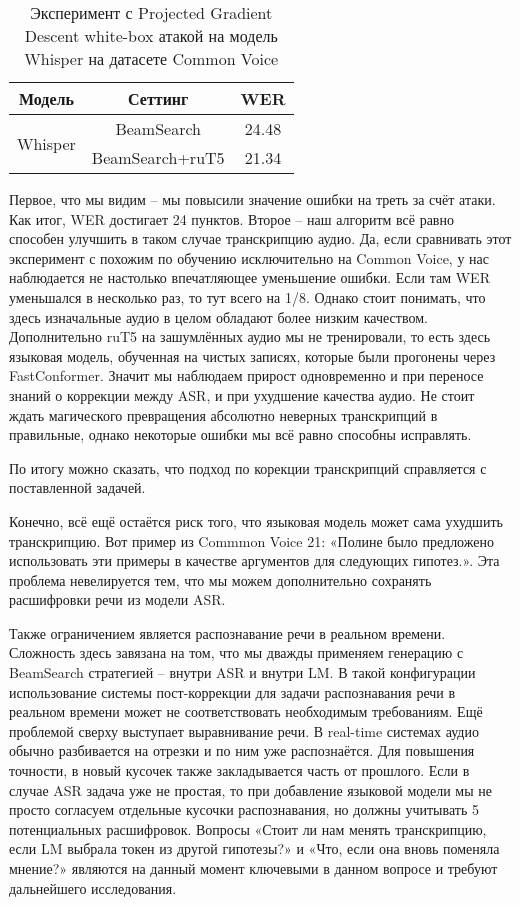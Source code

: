 \begin{table}[]
\centering
\caption{Эксперимент с Projected Gradient Descent white-box атакой на модель Whisper на датасете Common Voice}
\begin{tabular}{|c|c|c|}
\hline
Модель                         & Сеттинг                              & WER     \\ \hline
\multirow{2}{*}{Whisper}       & BeamSearch                           & 24.48   \\ \cline{2-3} 
                               & BeamSearch+ruT5                      & 21.34   \\ \hline
\end{tabular}
\label{tab:pgd}
\end{table}

Первое, что мы видим -- мы повысили значение ошибки на треть за счёт атаки.
Как итог, WER достигает 24 пунктов.
Второе -- наш алгоритм всё равно способен улучшить в таком случае транскрипцию аудио.
Да, если сравнивать этот эксперимент с похожим по обучению исключительно на Common Voice, у нас наблюдается не настолько впечатляющее уменьшение ошибки.
Если там WER уменьшался в несколько раз, то тут всего на 1/8.
Однако стоит понимать, что здесь изначальные аудио в целом обладают более низким качеством.
Дополнительно ruT5 на зашумлённых аудио мы не тренировали, то есть здесь языковая модель, обученная на чистых записях, которые были прогонены через FastConformer.
Значит мы наблюдаем прирост одновременно и при переносе знаний о коррекции между ASR, и при ухудшение качества аудио.
Не стоит ждать магического превращения абсолютно неверных транскрипций в правильные, однако некоторые ошибки мы всё равно способны исправлять.

По итогу можно сказать, что подход по корекции транскрипций справляется с поставленной задачей.

Конечно, всё ещё остаётся риск того, что языковая модель может сама ухудшить транскрипцию.
Вот пример из Commmon Voice 21: «Полине было предложено использовать эти примеры в качестве аргументов для следующих гипотез.».
Эта проблема невелируется тем, что мы можем дополнительно сохранять расшифровки речи из модели ASR.

Также ограничением является распознавание речи в реальном времени.
Сложность здесь завязана на том, что мы дважды применяем генерацию с BeamSearch стратегией -- внутри ASR и внутри LM.
В такой конфигурации использование системы пост-коррекции для задачи распознавания речи в реальном времени может не соответствовать необходимым требованиям.
Ещё проблемой сверху выступает выравнивание речи.
В real-time системах аудио обычно разбивается на отрезки и по ним уже распознаётся.
Для повышения точности, в новый кусочек также закладывается часть от прошлого.
Если в случае ASR задача уже не простая, то при добавление языковой модели мы не просто согласуем отдельные кусочки распознавания, но должны учитывать 5 потенциальных расшифровок.
Вопросы «Стоит ли нам менять транскрипцию, если LM выбрала токен из другой гипотезы?» и «Что, если она вновь поменяла мнение?» являются на данный момент ключевыми в данном вопросе и требуют дальнейшего исследования.

